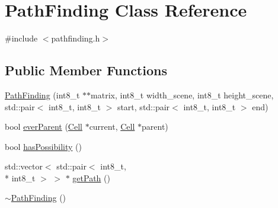 \hypertarget{class_path_finding}{\section{Path\-Finding Class Reference}
\label{class_path_finding}
}


{\ttfamily \#include $<$pathfinding.\-h$>$}

\subsection*{Public Member Functions}
\begin{DoxyCompactItemize}
\item 
\hyperlink{class_path_finding_a886575c3dc169578626ba9dbf45744be}{Path\-Finding} (int8\-\_\-t $\ast$$\ast$matrix, int8\-\_\-t width\-\_\-scene, int8\-\_\-t height\-\_\-scene, std\-::pair$<$ int8\-\_\-t, int8\-\_\-t $>$ start, std\-::pair$<$ int8\-\_\-t, int8\-\_\-t $>$ end)
\item 
bool \hyperlink{class_path_finding_a3ff60b1cb0a54bfd10dbc75bfce9b47d}{ever\-Parent} (\hyperlink{class_cell}{Cell} $\ast$current, \hyperlink{class_cell}{Cell} $\ast$parent)
\item 
bool \hyperlink{class_path_finding_a8d70d17f06400cdcd5787331d7be38e2}{has\-Possibility} ()
\item 
std\-::vector$<$ std\-::pair$<$ int8\-\_\-t, \\*
int8\-\_\-t $>$ $>$ $\ast$ \hyperlink{class_path_finding_a536055d11c630edc210d100d832a5ccf}{get\-Path} ()
\item 
\hyperlink{class_path_finding_a0fc7389a32fa31a194a940a89f252bdb}{$\sim$\-Path\-Finding} ()
\end{DoxyCompactItemize}


